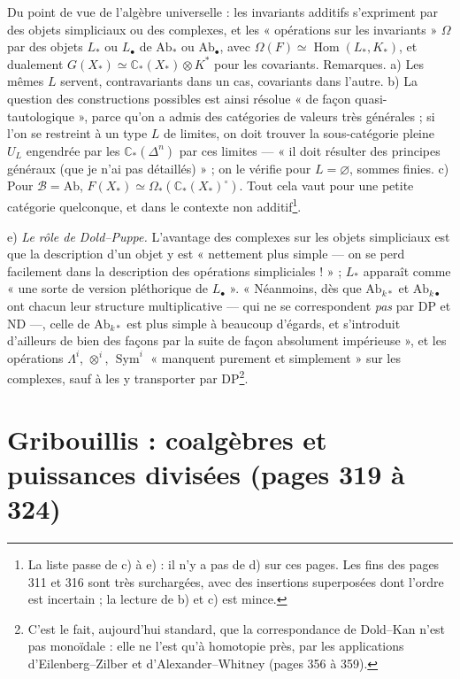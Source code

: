 \documentclass[11pt,a4paper]{article}
\begin{document}
Du point de vue de l'algèbre universelle : les invariants additifs s'expriment
par des objets simpliciaux ou des complexes, et les « opérations sur les
invariants » $\Omega$ par des objets $L_*$ ou $L_\bullet$ de $\mathrm{Ab}_*$ ou
$\mathrm{Ab}_\bullet$, avec $\Omega(F) \simeq \operatorname{Hom}(L_*, K_*)$, et
dualement $G(X_*) \simeq \mathbb{C}_*(X_*) \otimes K^*$ pour les covariants.
Remarques. a) Les mêmes $L$ servent, contravariants dans un cas, covariants dans
l'autre. b) La question des constructions possibles est ainsi résolue « de façon
quasi-tautologique », parce qu'on a admis des catégories de valeurs très
générales ; si l'on se restreint à un type $L$ de limites, on doit trouver la
sous-catégorie pleine $U_L$ engendrée par les $\mathbb{C}_*(\Delta^n)$ par ces
limites — « il doit résulter des principes généraux (que je n'ai pas
détaillés) » ; on le vérifie pour $L = \varnothing$, sommes finies. c) Pour
$\mathcal{B} = \mathrm{Ab}$, $F(X_*) \simeq \Omega_*(\mathbb{C}_*(X_*)^\circ)$.
Tout cela vaut pour une petite catégorie quelconque, et dans le contexte non
additif\footnote{La liste passe de c) à e) : il n'y a pas de d) sur ces pages.
Les fins des pages 311 et 316 sont très surchargées, avec des insertions
superposées dont l'ordre est incertain ; la lecture de b) et c) est mince.}.

e) \emph{Le rôle de Dold–Puppe.} L'avantage des complexes sur les objets
simpliciaux est que la description d'un objet y est « nettement plus simple — on
se perd facilement dans la description des opérations simpliciales ! » ; $L_*$
apparaît comme « une sorte de version pléthorique de $L_\bullet$ ». « Néanmoins,
dès que $\mathrm{Ab}_{k*}$ et $\mathrm{Ab}_{k\bullet}$ ont chacun leur structure
multiplicative — qui ne se correspondent \emph{pas} par DP et ND —, celle de
$\mathrm{Ab}_{k*}$ est plus simple à beaucoup d'égards, et s'introduit d'ailleurs
de bien des façons par la suite de façon absolument impérieuse », et les
opérations $\Lambda^i$, $\otimes^i$, $\operatorname{Sym}^i$ « manquent purement et
simplement » sur les complexes, sauf à les y transporter par DP\footnote{C'est
le fait, aujourd'hui standard, que la correspondance de Dold–Kan n'est pas
monoïdale : elle ne l'est qu'à homotopie près, par les applications
d'Eilenberg–Zilber et d'Alexander–Whitney (pages 356 à 359).}.

\section*{Gribouillis : coalgèbres et puissances divisées (pages 319 à 324)}
\end{document}
